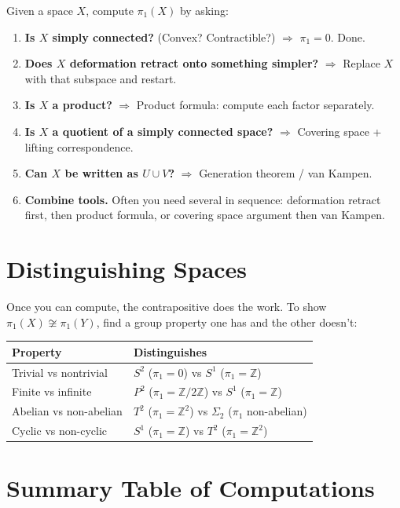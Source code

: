 \documentclass[11pt]{report}
\begin{document}
Given a space $X$, compute $\pi_1(X)$ by asking:
\begin{enumerate}
    \item \textbf{Is $X$ simply connected?} (Convex? Contractible?) $\Rightarrow$ $\pi_1 = 0$. Done.
    \item \textbf{Does $X$ deformation retract onto something simpler?} $\Rightarrow$ Replace $X$ with that subspace and restart.
    \item \textbf{Is $X$ a product?} $\Rightarrow$ Product formula: compute each factor separately.
    \item \textbf{Is $X$ a quotient of a simply connected space?} $\Rightarrow$ Covering space + lifting correspondence.
    \item \textbf{Can $X$ be written as $U \cup V$?} $\Rightarrow$ Generation theorem / van Kampen.
    \item \textbf{Combine tools.} Often you need several in sequence: deformation retract first, then product formula, or covering space argument then van Kampen.
\end{enumerate}

\section{Distinguishing Spaces}

Once you can compute, the contrapositive does the work. To show $\pi_1(X) \not\cong \pi_1(Y)$, find a group property one has and the other doesn't:

\begin{center}
\small
\begin{tabular}{|p{4cm}|p{6cm}|}
\hline
\textbf{Property} & \textbf{Distinguishes} \\
\hline
Trivial vs nontrivial & $S^2$ ($\pi_1 = 0$) vs $S^1$ ($\pi_1 = \mathbb{Z}$) \\
\hline
Finite vs infinite & $P^2$ ($\pi_1 = \mathbb{Z}/2\mathbb{Z}$) vs $S^1$ ($\pi_1 = \mathbb{Z}$) \\
\hline
Abelian vs non-abelian & $T^2$ ($\pi_1 = \mathbb{Z}^2$) vs $\Sigma_2$ ($\pi_1$ non-abelian) \\
\hline
Cyclic vs non-cyclic & $S^1$ ($\pi_1 = \mathbb{Z}$) vs $T^2$ ($\pi_1 = \mathbb{Z}^2$) \\
\hline
\end{tabular}
\end{center}

\section{Summary Table of Computations}
\end{document}
